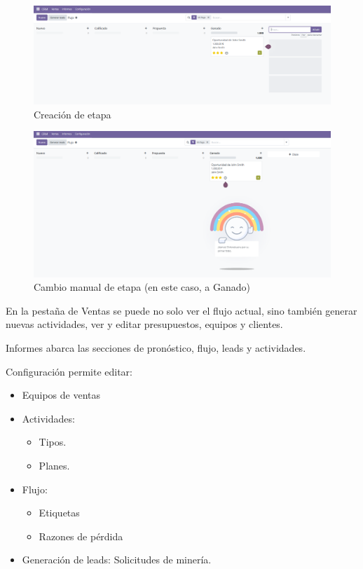 \documentclass[a4paper,12pt]{article}
\begin{document}
\begin{figure}[h!]
    \centering
    \includegraphics[width=1\textwidth]{pr2odoo74-crearEtapa.png}
    \caption{Creación de etapa}
\end{figure}
\FloatBarrier

\begin{figure}[h!]
    \centering
    \includegraphics[width=1\textwidth]{pr2odoo75-cambioManualDeEtapa.png}
    \caption{Cambio manual de etapa (en este caso, a Ganado)}
\end{figure}
\FloatBarrier

En la pestaña de Ventas se puede no solo ver el flujo actual, sino también generar nuevas actividades, ver y editar presupuestos, equipos y clientes.

Informes abarca las secciones de pronóstico, flujo, leads y actividades.

Configuración permite editar:
\begin{itemize}
    \item Equipos de ventas
    \item Actividades:
    \begin{itemize}
        \item Tipos.
        \item Planes.
    \end{itemize}
    \item Flujo:
    \begin{itemize}
        \item Etiquetas
        \item Razones de pérdida
    \end{itemize}
    \item Generación de leads: Solicitudes de minería.
\end{itemize}
\end{document}
